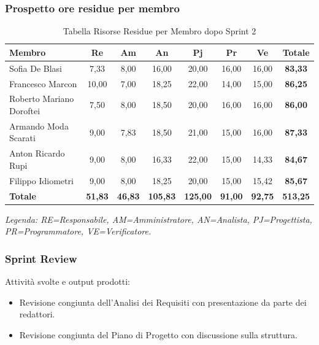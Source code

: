\subsubsection{Prospetto ore residue per membro}
\begin{table}[H]
    \centering
    \renewcommand{\arraystretch}{1.3}
    \begin{tabularx}{\textwidth}{|X|c|c|c|c|c|c|c|}
        \hline
        \textbf{Membro} & \textbf{Re} & \textbf{Am} & \textbf{An} & \textbf{Pj} & \textbf{Pr} & \textbf{Ve} & \textbf{Totale} \\
        \hline
        Sofia De Blasi & 7,33 & 8,00 & 16,00 & 20,00 & 16,00 & 16,00 & \textbf{83,33} \\
        Francesco Marcon & 10,00 & 7,00 & 18,25 & 22,00 & 14,00 & 15,00 & \textbf{86,25} \\
        Roberto Mariano Doroftei & 7,50 & 8,00 & 18,50 & 20,00 & 16,00 & 16,00 & \textbf{86,00} \\
        Armando Moda Scarati & 9,00 & 7,83 & 18,50 & 21,00 & 15,00 & 16,00 & \textbf{87,33} \\
        Anton Ricardo Rupi & 9,00 & 8,00 & 16,33 & 22,00 & 15,00 & 14,33 & \textbf{84,67} \\
        Filippo Idiometri & 9,00 & 8,00 & 18,25 & 20,00 & 15,00 & 15,42 & \textbf{85,67} \\


        \hline
        \textbf{Totale} & \textbf{51,83} & \textbf{46,83} & \textbf{105,83} & \textbf{125,00} & \textbf{91,00} & \textbf{92,75} & \textbf{513,25} \\
        \hline
    \end{tabularx}
    \begin{minipage}{\textwidth}
        \smallskip
        \footnotesize\textit{Legenda: RE=Responsabile, AM=Amministratore,
        AN=Analista, PJ=Progettista, PR=Programmatore, VE=Verificatore.}
    \end{minipage}
    \caption{Tabella Risorse Residue per Membro dopo Sprint 2}
\end{table}

\subsubsection{Sprint Review}
Attività svolte e output prodotti:
\begin{itemize}
    \item Revisione congiunta dell’Analisi dei Requisiti con presentazione da parte dei redattori.
    \item Revisione congiunta del Piano di Progetto con discussione sulla struttura.
\end{itemize}

